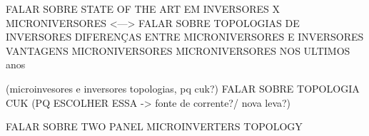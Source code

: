 \documentclass[
	12pt,				%
	openright,			%
	onseside,
	a4paper,			%
	english,			%
	french,				%
	spanish,			%
	brazil,				%
	]{abntex2}
\begin{document}
FALAR SOBRE  STATE OF THE ART EM INVERSORES X MICRONIVERSORES <---> FALAR SOBRE TOPOLOGIAS DE INVERSORES
DIFERENÇAS ENTRE MICRONIVERSORES E INVERSORES
VANTAGENS MICRONIVERSORES
MICRONIVERSORES NOS ULTIMOS anos

(microinvesores e inversores topologias, pq cuk?)
FALAR SOBRE TOPOLOGIA CUK (PQ ESCOLHER ESSA -> fonte de corrente?/ nova leva?)


	FALAR SOBRE TWO PANEL MICROINVERTERS TOPOLOGY




\end{document}
